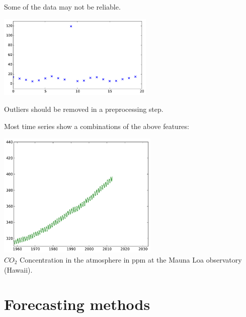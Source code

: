 \documentclass{beamer}
\begin{document}
\begin{frame}{}
 Some of the data may not be reliable.\\
\vspace{5mm}
\begin{center}
\includegraphics[height=4cm]{figures/2_outliers}
\end{center}
\vspace{5mm}
Outliers should be removed in a preprocessing step.
\end{frame}

\begin{frame}{}
Most time series show a combinations of the above features:
\begin{center}
\includegraphics[height=6cm]{figures/CO2-data}\\
$CO_2$ Concentration in the atmosphere in ppm at the Mauna Loa observatory (Hawaii).
\end{center}

\end{frame}

\section{Forecasting methods}
\end{document}
